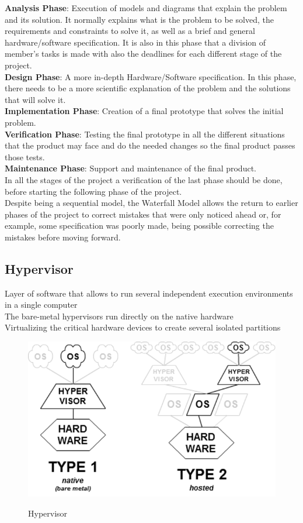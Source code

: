 \noindent \textbf{Analysis Phase}: Execution of models and diagrams that explain the problem and its solution. It normally explains what is the problem to be solved, the requirements and constraints to solve it, as well as a brief and general hardware/software specification. It is also in this phase that a division of member’s tasks is made with also the deadlines for each different stage of the project. \\[\baselineskip]
\textbf{Design Phase}: A more in-depth Hardware/Software specification. In this phase, there needs to be a more scientific explanation of the problem and the solutions that will solve it.\\[\baselineskip]
\textbf{Implementation Phase}: Creation of a final prototype that solves the initial problem.\\[\baselineskip]
\textbf{Verification Phase}: Testing the final prototype in all the different situations that the product may face and do the needed changes so the final product passes those tests.\\[\baselineskip]
\textbf{Maintenance Phase}: Support and maintenance of the final product.\\[\baselineskip]
\indent In all the stages of the project a verification of the last phase should be done, before starting the following phase of the project.\\
\indent Despite being a sequential model, the Waterfall Model allows the return to earlier
phases of the project to correct mistakes that were only noticed ahead or, for example, some specification was poorly made, being possible correcting the mistakes before moving forward.

\subsection{Hypervisor}
Layer of software that allows to run several independent execution environments in a single
computer\\
\indent The bare-metal hypervisors run directly on the native hardware\\
\indent Virtualizing the critical hardware devices to create several isolated partitions

\begin{figure}[!h]
	\center
	\label{figure6}
	\includegraphics[scale=0.65]{Figures/Hypervisor} \\
	\caption {Hypervisor}
\end{figure}


